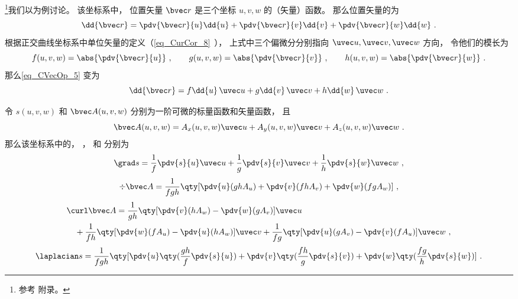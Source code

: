 

\footnote{参考 \cite{GriffE} 附录。}我们以为例讨论。 该坐标系中， 位置矢量 $\bvec r$ 是三个坐标 $u, v, w$ 的（矢量）函数。 那么位置矢量的为
\begin{equation}\label{eq_CVecOp_5}
\dd{\bvec r} = \pdv{\bvec r}{u}\dd{u} + \pdv{\bvec r}{v}\dd{v} + \pdv{\bvec r}{w}\dd{w}~.
\end{equation}
根据正交曲线坐标系中单位矢量的定义（\autoref{eq_CurCor_8}~）， 上式中三个偏微分分别指向 $\uvec u, \uvec v, \uvec w$ 方向， 令他们的模长为
\begin{equation}
f(u,v,w) = \abs{\pdv{\bvec r}{u}}~, \qquad
g(u,v,w) = \abs{\pdv{\bvec r}{v}} ~,\qquad
h(u,v,w) = \abs{\pdv{\bvec r}{w}}~.
\end{equation}
那么\autoref{eq_CVecOp_5} 变为
\begin{equation}\label{eq_CVecOp_4}
\dd{\bvec r} = f\dd{u}\,\uvec u + g\dd{v}\,\uvec v + h\dd{w}\,\uvec w~.
\end{equation}


令 $s(u, v, w)$ 和 $\bvec A(u, v, w)$ 分别为一阶可微的标量函数和矢量函数， 且
\begin{equation}\label{eq_CVecOp_7}
\bvec A(u, v, w) = A_x(u, v, w)\uvec u + A_y(u, v, w)\uvec v + A_z(u, v, w)\uvec w~.
\end{equation}
那么该坐标系中的， ， 和 分别为
\begin{equation}\label{eq_CVecOp_1}
\grad s = \frac{1}{f} \pdv{s}{u}\uvec u + \frac{1}{g}\pdv{s}{v} \uvec v + \frac{1}{h} \pdv{s}{w}\uvec w~,
\end{equation}
\begin{equation}\label{eq_CVecOp_2}
\div \bvec A = \frac{1}{fgh}\qty[\pdv{u}(ghA_u) + \pdv{v}(fhA_v) + \pdv{w}(fgA_w)]~,
\end{equation}
\begin{equation}\label{eq_CVecOp_3}
\begin{aligned}
&\curl \bvec A = \frac{1}{gh}\qty[\pdv{v}(hA_w) - \pdv{w}(gA_v)]\uvec u\\
&\quad + \frac{1}{fh}\qty[\pdv{w}(fA_u) - \pdv{u}(hA_w)]\uvec v
+ \frac{1}{fg}\qty[\pdv{u}(gA_v) - \pdv{v}(fA_u)]\uvec w~,
\end{aligned}
\end{equation}
\begin{equation}\label{eq_CVecOp_6}
\laplacian s = \frac{1}{fgh}\qty[\pdv{u}\qty(\frac{gh}{f}\pdv{s}{u}) + \pdv{v}\qty(\frac{fh}{g}\pdv{s}{v}) + \pdv{w}\qty(\frac{fg}{h}\pdv{s}{w})]~.
\end{equation}

